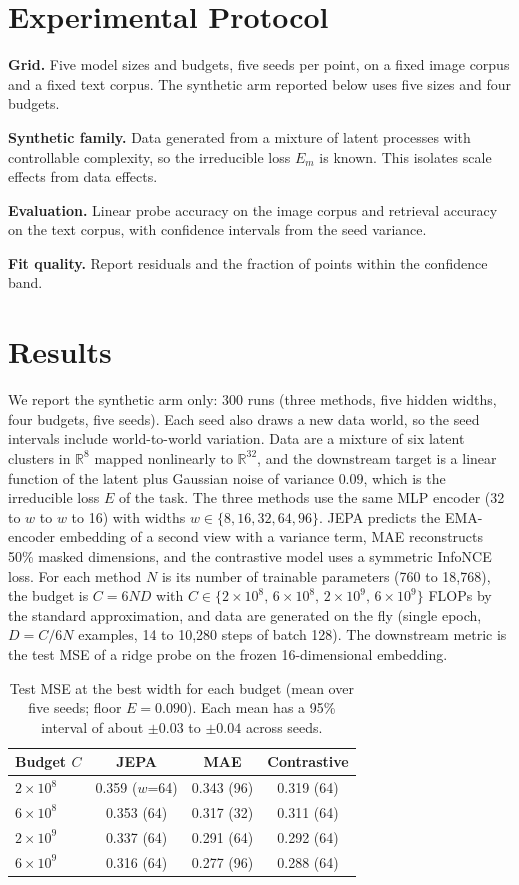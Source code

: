 \documentclass[conference]{IEEEtran}
\begin{document}
\section{Experimental Protocol}
\textbf{Grid.} Five model sizes and budgets, five seeds per point, on a fixed image corpus and a fixed text corpus. The synthetic arm reported below uses five sizes and four budgets.

\textbf{Synthetic family.} Data generated from a mixture of latent processes with controllable complexity, so the irreducible loss $E_m$ is known. This isolates scale effects from data effects.

\textbf{Evaluation.} Linear probe accuracy on the image corpus and retrieval accuracy on the text corpus, with confidence intervals from the seed variance.

\textbf{Fit quality.} Report residuals and the fraction of points within the confidence band.

\section{Results}
We report the synthetic arm only: 300 runs (three methods, five hidden widths, four budgets, five seeds). Each seed also draws a new data world, so the seed intervals include world-to-world variation. Data are a mixture of six latent clusters in $\mathbb{R}^8$ mapped nonlinearly to $\mathbb{R}^{32}$, and the downstream target is a linear function of the latent plus Gaussian noise of variance $0.09$, which is the irreducible loss $E$ of the task. The three methods use the same MLP encoder (32 to $w$ to $w$ to 16) with widths $w\in\{8,16,32,64,96\}$. JEPA predicts the EMA-encoder embedding of a second view with a variance term, MAE reconstructs 50\% masked dimensions, and the contrastive model uses a symmetric InfoNCE loss. For each method $N$ is its number of trainable parameters (760 to 18{,}768), the budget is $C=6ND$ with $C\in\{2\times10^8,\,6\times10^8,\,2\times10^9,\,6\times10^9\}$ FLOPs by the standard approximation, and data are generated on the fly (single epoch, $D=C/6N$ examples, 14 to 10{,}280 steps of batch 128). The downstream metric is the test MSE of a ridge probe on the frozen 16-dimensional embedding.

\begin{table}[!t]
\caption{Test MSE at the best width for each budget (mean over five seeds; floor $E=0.090$). Each mean has a 95\% interval of about $\pm0.03$ to $\pm0.04$ across seeds.}
\label{tab:scaling}
\centering
\begin{tabular}{lccc}
\hline
Budget $C$ & JEPA & MAE & Contrastive \\
\hline
$2\times10^8$ & 0.359 ($w$=64) & 0.343 (96) & 0.319 (64) \\
$6\times10^8$ & 0.353 (64)     & 0.317 (32) & 0.311 (64) \\
$2\times10^9$ & 0.337 (64)     & 0.291 (64) & 0.292 (64) \\
$6\times10^9$ & 0.316 (64)     & 0.277 (96) & 0.288 (64) \\
\hline
\end{tabular}
\end{table}
\end{document}
